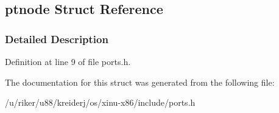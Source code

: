 \hypertarget{structptnode}{}\subsection{ptnode Struct Reference}
\label{structptnode}


\subsubsection{Detailed Description}


Definition at line 9 of file ports.\+h.



The documentation for this struct was generated from the following file\+:\begin{DoxyCompactItemize}
\item 
/u/riker/u88/kreiderj/os/xinu-\/x86/include/ports.\+h\end{DoxyCompactItemize}
